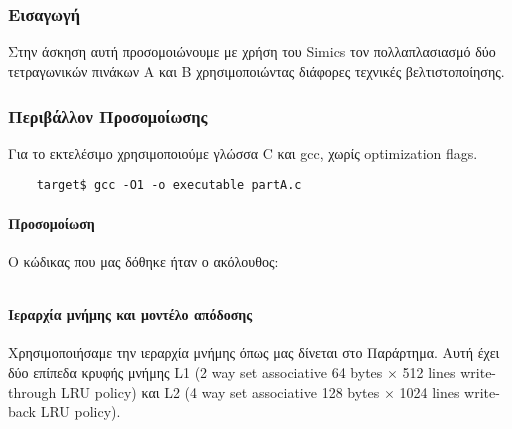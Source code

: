 \documentclass[a4paper,12pt]{article}
\begin{document}
\def\thepart{\Alph{part}}



\part{}

\section{Εισαγωγή}
Στην άσκηση αυτή προσομοιώνουμε με χρήση του Simics τον πολλαπλασιασμό δύο
τετραγωνικών πινάκων Α και Β χρησιμοποιώντας διάφορες τεχνικές
βελτιστοποίησης. 


\section{Περιβάλλον Προσομοίωσης}
Για το εκτελέσιμο χρησιμοποιούμε γλώσσα C και gcc, χωρίς
optimization flags.

\begin{verbatim}
    target$ gcc -O1 -o executable partA.c
\end{verbatim}


\subsection{Προσομοίωση}
Ο κώδικας που μας δόθηκε ήταν ο ακόλουθος:

\inputminted[linenos,fontsize=\scriptsize,frame=leftline]{c}{files/partA1-default-partA.c}


\pagebreak


\subsection{Ιεραρχία μνήμης και μοντέλο απόδοσης}

Χρησιμοποιήσαμε την ιεραρχία μνήμης όπως μας δίνεται στο Παράρτημα. Αυτή έχει
δύο επίπεδα κρυφής μνήμης L1 (2 way set associative 64 bytes $\times$ 512 lines
write-through LRU policy) και
L2 (4 way set associative 128 bytes $\times$ 1024 lines write-back LRU policy).
\end{document}
